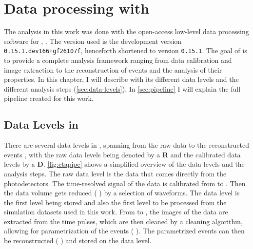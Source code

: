 \chapter{Data processing with \ctapipe{}}
\label{ch:data-processing}

The analysis in this work was done with the open-access low-level data processing software for \cta{},
\ctapipe{} \cite{ctapipe}. The version used is the development version \texttt{0.15.1.dev166+gf26107f},
henceforth shortened to version \texttt{0.15.1}. The goal of \ctapipe{} is to provide a complete analysis
framework ranging from data calibration and image extraction to the reconstruction of events and the
analysis of their properties. In this chapter, I will describe \ctapipe{} with its different data
levels and the different analysis steps (\autoref{sec:data-levels}). In \autoref{sec:pipeline} I will
explain the full pipeline created for this work.

\section{Data Levels in \ctapipe{}}
\label{sec:data-levels}

There are several data levels in \ctapipe{}, spanning from the raw data \rzero{} to the reconstructed events
\dlt{}, with the raw data levels being denoted by a \textbf{R} and the calibrated data levels by a \textbf{D}.
\autoref{fig:ctapipe} shows a simplified overview of the data levels and the analysis steps.
The raw data level \rzero{} is the data that comes directly from the photodetectors. The time-resolved
signal of the data is calibrated from \rzero{} to \rone{}. Then the data volume gets reduced
(\rone{} \rightarrow \dlz{}) by a selection of waveforms. The \dlz{} data level is the first level being
stored and also the first level to be processed from the simulation datasets used in this work.
From \dlz{} to \dloa{}, the images of the data are extracted from the time pulses, which are then
cleaned by a cleaning algorithm, allowing for parametrization of the events (\dloa{} \rightarrow \dlob{}).
The parametrized events can then be reconstructed (\dlob{} \rightarrow \dlt{}) and stored on the \dlt{} data level.

